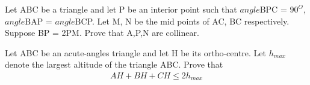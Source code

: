 \item Let ABC be a triangle and let P be an interior point such that $angle$BPC = $90^{O}$, $angle$BAP =  $angle$BCP. Let M, N be the mid points of AC, BC respectively. Suppose BP = 2PM. Prove that A,P,N are collinear.

\item Let ABC be an acute-angles triangle and let H be its ortho-centre. Let $h_{max}$ denote the largest altitude of the triangle ABC. Prove that
\begin{align*}
AH + BH + CH \leq 2h_{max}
\end{align*}





















